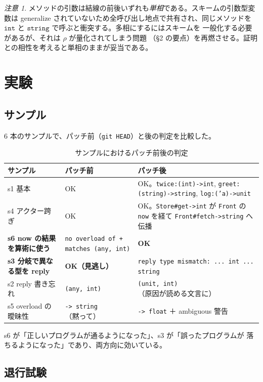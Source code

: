 \documentclass[11pt,a4paper]{ltjsarticle}
\theoremstyle{definition}
\theoremstyle{remark}
\newtheorem{remark}{注意}
\newcommand{\ty}[1]{\ensuremath{\mathtt{#1}}}
\begin{document}
\begin{remark}
メソッドの引数は結線の前後いずれも\emph{単相}である。スキームの引数型変数は
generalize されていないため全呼び出し地点で共有され、同じメソッドを
\ty{int} と \ty{string} で呼ぶと衝突する。多相にするにはスキームを
一般化する必要があるが、それは $\rho$ が量化されてしまう問題
（\S 2 の要点）を再燃させる。証明との相性を考えると単相のままが妥当である。
\end{remark}

\section{実験}
\label{sec:experiment}

\subsection{サンプル}

6 本のサンプルで、パッチ前（\texttt{git HEAD}）と後の判定を比較した。

\begin{table}[htbp]
\centering
\small
\begin{tabular}{@{}p{4.4cm}p{4.6cm}p{5.4cm}@{}}
\toprule
サンプル & パッチ前 & パッチ後 \\
\midrule
s1 基本 & OK & OK。\texttt{twice:(int)->int},
  \texttt{greet:(string)->string}, \texttt{log:('a)->unit} \\
s4 アクター跨ぎ & OK & OK。\texttt{Store\#get->int} が \texttt{Front} の
  \texttt{now} を経て \texttt{Front\#fetch->string} へ伝播 \\
\textbf{s6 now の結果を算術に使う} &
  \texttt{no overload of + matches (any, int)} & \textbf{OK} \\
\textbf{s3 分岐で異なる型を reply} & \textbf{OK（見逃し）} &
  \texttt{reply type mismatch: ... int ... string} \\
s2 reply 書き忘れ & \texttt{(any, int)} &
  \texttt{(unit, int)}（原因が読める文言に） \\
s5 overload の曖昧性 & \texttt{-> string}（黙って） &
  \texttt{-> float} ＋ ambiguous 警告 \\
\bottomrule
\end{tabular}
\caption{サンプルにおけるパッチ前後の判定}
\end{table}

s6 が「正しいプログラムが通るようになった」、s3 が「誤ったプログラムが
落ちるようになった」であり、両方向に効いている。

\subsection{退行試験}
\end{document}
